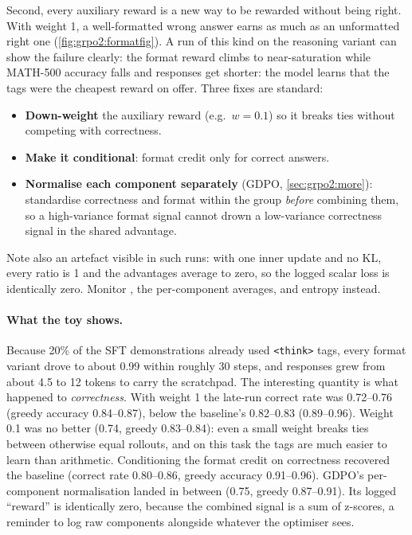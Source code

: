Second, every auxiliary reward is a new way to be rewarded without being right. With weight 1,
a well-formatted wrong answer earns as much as an unformatted right one
(\cref{fig:grpo2:formatfig}). A run of this kind on the reasoning variant can show the failure clearly: the format
reward climbs to near-saturation while MATH-500 accuracy falls and responses get shorter: the
model learns that the tags were the cheapest reward on offer. Three fixes are standard:
\begin{itemize}
\item \textbf{Down-weight} the auxiliary reward (e.g.\ $w=0.1$) so it breaks ties without
competing with correctness.
\item \textbf{Make it conditional}: format credit only for correct answers.
\item \textbf{Normalise each component separately} (GDPO, \cref{sec:grpo2:more}): standardise
correctness and format within the group \emph{before} combining them, so a high-variance
format signal cannot drown a low-variance correctness signal in the shared advantage.
\end{itemize}
Note also an artefact visible in such runs: with one inner update and no KL, every ratio is 1
and the advantages average to zero, so the logged scalar loss is identically zero. Monitor
, the per-component averages,  and entropy instead.

\paragraph{What the toy shows.} Because 20\% of the SFT demonstrations already used
\verb|<think>| tags, every format variant drove  to about 0.99 within
roughly 30 steps, and responses grew from about 4.5 to 12 tokens to carry the scratchpad. The
interesting quantity is what happened to \emph{correctness}. With weight 1 the late-run
correct rate was 0.72--0.76 (greedy accuracy 0.84--0.87), below the baseline's 0.82--0.83
(0.89--0.96). Weight 0.1 was no better (0.74, greedy 0.83--0.84): even a small weight breaks
ties between otherwise equal rollouts, and on this task the tags are much easier to learn
than arithmetic. Conditioning the format credit on correctness recovered the baseline
(correct rate 0.80--0.86, greedy accuracy 0.91--0.96). GDPO's per-component normalisation
landed in between (0.75, greedy 0.87--0.91). Its logged ``reward'' is identically zero,
because the combined signal is a sum of z-scores, a reminder to log raw components alongside
whatever the optimiser sees.


